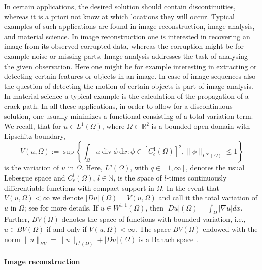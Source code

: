 \documentclass[enabledeprecatedfontcommands,cleardoublepage=empty,headsepline,twoside,11pt,DIV=15,BCOR=12mm,final]{scrartcl}
\newcommand{\N}{{\mathbb N}}
\newcommand{\R}{{\mathbb R}}
\begin{document}
In certain applications, the desired solution should contain discontinuities, whereas it is a priori not know at which locations they will occur. Typical examples of such applications are found in image reconstruction, image analysis, and material science. In image reconstruction one is interested in recovering an image from its observed corrupted data, whereas the corruption might be for example noise or missing parts. Image analysis addresses the task of analysing the given observation. Here one might be for example interesting in extracting or detecting certain features or objects in an image. In case of image sequences also the question of detecting the motion of certain objects is part of image analysis. In material science a typical example is the calculation of the propagation of a crack path. In all these applications, in order to allow for a discontinuous solution, one usually minimizes a functional consisting of a total variation term. We recall, that for $u\in L^1(\Omega)$, where $\Omega \subset \R^2$ is a bounded open domain with Lipschitz boundary,
$$
V(u,\Omega):=\sup\left\{\int_{\Omega} u \operatorname{div} \phi \ \text{d}x : \phi \in [C_c^1(\Omega)]^2, \|{\phi}\|_{L^\infty(\Omega)} \leq 1\right\}
$$
is the variation of $u$ in $\Omega$. Here, $L^q(\Omega)$, with $q\in [1,\infty]$, denotes the usual Lebesgue space \cite{AdaFou} and $C_c^l(\Omega)$, $l\in \N$, is the space of $l$-times continuously differentiable functions with compact support in $\Omega$. In the event that $V(u,\Omega)<\infty$ we denote $|Du|(\Omega)=V(u,\Omega)$ and call it the total variation of $u$ in $\Omega$; see \cite{AmbFusPal, Giu} for more details. If $u\in W^{1,1}(\Omega)$, then $|Du|(\Omega)= \int_{\Omega}|\nabla u| dx$. Further, $BV(\Omega)$ denotes the space of functions with bounded variation, i.e., $u\in BV(\Omega)$ if and only if $V(u,\Omega)<\infty$. The space $BV(\Omega)$ endowed with the norm $\|u\|_{BV} = \|u\|_{L^1(\Omega)} + |Du|(\Omega)$ is a Banach space \cite{Giu}. 

\paragraph{Image reconstruction}
\end{document}
